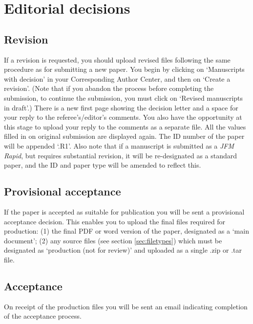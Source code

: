 \documentclass{jfm}
\begin{document}
\section{Editorial decisions}
\subsection{Revision}
If a revision is requested, you should upload revised files following the same procedure as for submitting a new paper. You begin by clicking on `Manuscripts with decision' in your Corresponding Author Center, and then on `Create a revision'. (Note that if you abandon the process before completing the submission, to continue the submission, you must click on `Revised manuscripts in draft'.) There is a new first page showing the decision letter and a space for your reply to the referee's/editor's comments. You also have the opportunity at this stage to upload your reply to the comments as a separate file. All the values filled in on original submission are displayed again. The ID number of the paper will be appended `.R1'. Also note that if a manuscript is submitted as a {\it JFM Rapid}, but requires substantial revision, it will be re-designated as a standard paper, and the ID and paper type will be amended to reflect this.

\subsection{Provisional acceptance}
If the paper is accepted as suitable for publication you will be sent a provisional acceptance decision. This enables you to upload the final files required for production:
(1) the final PDF or word version of the paper, designated as a `main document';
(2) any source files (see section \ref{sec:filetypes}) which must be designated as `production (not for review)' and uploaded as a single .zip or .tar file.

\subsection{Acceptance}
On receipt of the production files you will be sent an email indicating completion of the acceptance process.
\end{document}
